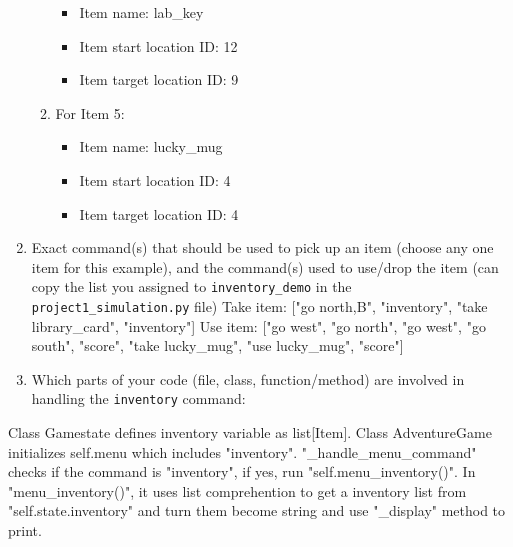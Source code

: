 \documentclass[11pt]{article}
\begin{document}
\begin{enumerate}
\begin{enumerate}
    \begin{itemize}
    \item Item name: lab\_key
    \item Item start location ID: 12
    \item Item target location ID: 9
    \end{itemize}
            \item For Item 5:
    \begin{itemize}
    \item Item name: lucky\_mug
    \item Item start location ID: 4
    \item Item target location ID: 4
    \end{itemize}
\end{enumerate}

    \item Exact command(s) that should be used to pick up an item (choose any one item for this example), and the command(s) used to use/drop the item (can copy the list you assigned to \texttt{inventory\_demo} in the \texttt{project1\_simulation.py} file)
Take item: ["go north,B", "inventory", "take library\_card", "inventory"]
Use item: ["go west", "go north", "go west", "go south", "score", "take lucky\_mug", "use lucky\_mug", "score"]

    \item Which parts of your code (file, class, function/method) are involved in handling the \texttt{inventory} command:
\end{enumerate}
Class Gamestate defines inventory variable as list[Item]. Class AdventureGame initializes self.menu which includes "inventory". "\_handle\_menu\_command" checks if the command is "inventory", if yes, run "self.menu\_inventory()". In "menu\_inventory()", it uses list comprehention to get a inventory list from "self.state.inventory" and turn them become string and use "\_display" method to print.
\end{document}
